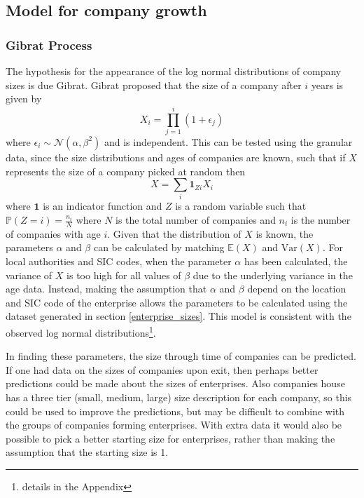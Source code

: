 \documentclass[a4paper,10pt]{article}
\begin{document}
\subsection{Model for company growth}
\subsubsection{Gibrat Process}
The hypothesis for the appearance of the log normal distributions of company sizes is due Gibrat. Gibrat proposed that the size of a company after $i$ years is given by
\begin{equation}
 X_i = \prod_{j=1}^{i}(1 + \epsilon_j)
 \label{company_size}
\end{equation}
where $\epsilon_i \sim \mathcal{N}(\alpha, \beta^2)$ and is independent. This can be tested using the granular data, since the size distributions and ages of companies are known, such that if $X$ represents the size of a company picked at random then
\begin{equation}
 X = \sum_{i}\mathbf{1}_{Zi}X_i
 \label{overall_dist}
\end{equation}
where $\mathbf{1}$ is an indicator function and $Z$ is a random variable such that $\mathbb{P}(Z = i) = \frac{n_i}{N}$ where $N$ is the total number of companies and $n_i$ is the number of companies with age $i$. Given that the distribution of $X$ is known, the parameters $\alpha$ and $\beta$ can be calculated by matching $\mathbb{E}(X)$ and $\mathrm{Var}(X)$. For local authorities and SIC codes, when the parameter $\alpha$ has been calculated, the variance of $X$ is too high for all values of $\beta$ due to the underlying variance in the age data. Instead, making the assumption that $\alpha$ and $\beta$ depend on the location and SIC code of the enterprise allows the parameters to be calculated using the dataset generated in section \ref{enterprise_sizes}. This model is consistent with the observed log normal distributions\footnote{details in the Appendix}. 

In finding these parameters, the size through time of companies can be predicted. If one had data on the sizes of companies upon exit, then perhaps better predictions could be made about the sizes of enterprises. Also companies house has a three tier (small, medium, large) size description for each company, so this could be used to improve the predictions, but may be difficult to combine with the groups of companies forming enterprises. With extra data it would also be possible to pick a better starting size for enterprises, rather than making the assumption that the starting size is 1.
\end{document}
